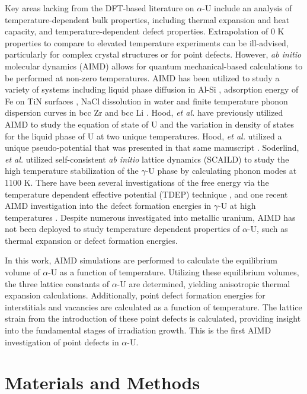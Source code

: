 \documentclass[utf8]{frontiersSCNS} %
\begin{document}
Key areas lacking from the DFT-based literature on $\alpha$-U include an analysis of temperature-dependent bulk properties, including thermal expansion and heat capacity, and temperature-dependent defect properties. Extrapolation of 0 K properties to compare to elevated temperature experiments can be ill-advised, particularly for complex crystal structures or for point defects. However, \textit{ab initio} molecular dynamics (AIMD) allows for quantum mechanical-based calculations to be performed at non-zero temperatures. AIMD has been utilized to study a variety of systems including liquid phase diffusion in Al-Si \cite{manga2018}, adsorption energy of Fe on TiN surfaces \cite{wang2010}, NaCl dissolution in water \cite{timko2010} and finite temperature phonon dispersion curves in bcc Zr and bcc Li \cite{hellman2011}. Hood, \textit{et al.} \cite{hood2008} have previously utilized AIMD to study the equation of state of U and the variation in density of states for the liquid phase of U at two unique temperatures. Hood, \textit{et al.} utilized a unique pseudo-potential that was presented in that same manuscript \cite{hood2008}. Soderlind, \textit{et al.} \cite{soderlind2012} utilized self-consistent \textit{ab initio} lattice dynamics (SCAILD) to study the high temperature stabilization of the $\gamma$-U phase by calculating phonon modes at 1100 K. There have been several investigations of the free energy via the temperature dependent effective potential (TDEP) technique \cite{hellman2013, ladygin2020, kruglov2019, bouchet2017, castellano2020}, and one recent AIMD investigation into the defect formation energies in $\gamma$-U at high temperatures \cite{beelerAIMD}. Despite numerous investigated into metallic uranium, AIMD has not been deployed to study temperature dependent properties of $\alpha$-U, such as thermal expansion or defect formation energies. 

In this work, AIMD simulations are performed to calculate the equilibrium volume of $\alpha$-U as a function of temperature. Utilizing these equilibrium volumes, the three lattice constants of $\alpha$-U are determined, yielding anisotropic thermal expansion calculations. Additionally, point defect formation energies for interstitials and vacancies are calculated as a function of temperature. The lattice strain from the introduction of these point defects is calculated, providing insight into the fundamental stages of irradiation growth. This is the first AIMD investigation of point defects in $\alpha$-U. 

\section{Materials and Methods}
\end{document}

